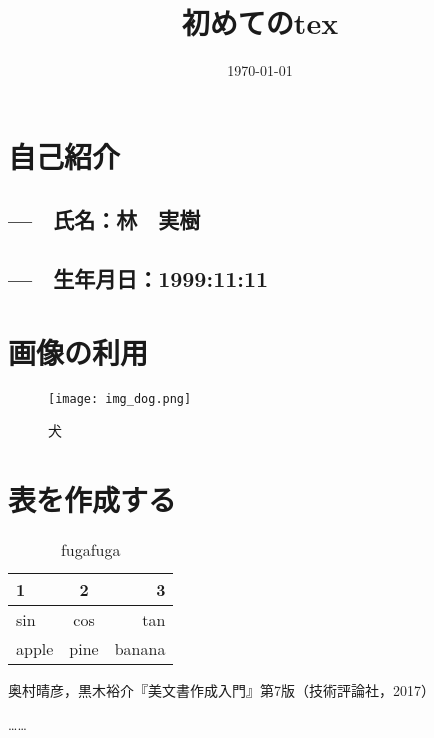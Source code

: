\documentclass{jsarticle}
\date{\today}
\title{初めてのtex}
\begin{document}
\maketitle
\section {自己紹介}
\subsection {---　氏名：林　実樹}

\subsection {---　生年月日：1999:11:11}
\section {画像の利用}
\begin{figure}[htbp]
\begin{center}
\texttt{[image: img\_dog.png]}
\caption{犬}
\end{center}
\end{figure}

\section {表を作成する}
\begin{table}[htbp]
  \centering
  \begin{tabular}{l|c|r}
    1 & 2 & 3 \\ \hline\hline
    sin & cos & tan \\
    apple & pine & banana \\ \hline
  \end{tabular}
  \caption{fugafuga}
  \label{tb:fugafuga}
\end{table}

\begin{thebibliography}{99}
  \item 奥村晴彦，黒木裕介『\LaTeXe 美文書作成入門』第7版（技術評論社，2017）
  \item ……
\end{thebibliography}
\end{document}
